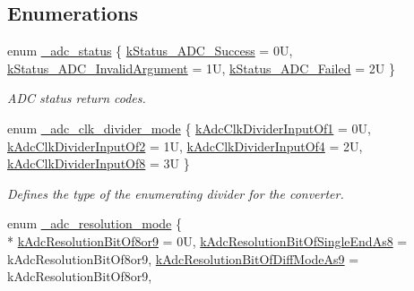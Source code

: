 \subsection*{Enumerations}
\begin{DoxyCompactItemize}
\item 
enum \hyperlink{group__adc__hal_ga058351bf32e58c665f0c7869f5cae4eb}{\+\_\+adc\+\_\+status} \{ \hyperlink{group__adc__hal_gga058351bf32e58c665f0c7869f5cae4eba71dfa17f1dfa9065f046127d9c4b49e3}{k\+Status\+\_\+\+A\+D\+C\+\_\+\+Success} = 0U, 
\hyperlink{group__adc__hal_gga058351bf32e58c665f0c7869f5cae4eba2fee5b051bf1951f27b2e162e4041a17}{k\+Status\+\_\+\+A\+D\+C\+\_\+\+Invalid\+Argument} = 1U, 
\hyperlink{group__adc__hal_gga058351bf32e58c665f0c7869f5cae4ebafedeadb3925bed1bf50a883b6c900521}{k\+Status\+\_\+\+A\+D\+C\+\_\+\+Failed} = 2U
 \}\begin{DoxyCompactList}\small\item\em A\+DC status return codes. \end{DoxyCompactList}
\item 
enum \hyperlink{group__adc__hal_gab7c3af47d538315640945a1a90460a08}{\+\_\+adc\+\_\+clk\+\_\+divider\+\_\+mode} \{ \hyperlink{group__adc__hal_ggab7c3af47d538315640945a1a90460a08a5c8ddf62a08acebd0fc23547e422bc5a}{k\+Adc\+Clk\+Divider\+Input\+Of1} = 0U, 
\hyperlink{group__adc__hal_ggab7c3af47d538315640945a1a90460a08aa8acb30681136a660a31453087d109db}{k\+Adc\+Clk\+Divider\+Input\+Of2} = 1U, 
\hyperlink{group__adc__hal_ggab7c3af47d538315640945a1a90460a08a0b4421a73a24bb0a00f67d70f87dadfb}{k\+Adc\+Clk\+Divider\+Input\+Of4} = 2U, 
\hyperlink{group__adc__hal_ggab7c3af47d538315640945a1a90460a08ae9da6126c381cd4c0b79d0f082a066d1}{k\+Adc\+Clk\+Divider\+Input\+Of8} = 3U
 \}\begin{DoxyCompactList}\small\item\em Defines the type of the enumerating divider for the converter. \end{DoxyCompactList}
\item 
enum \hyperlink{group__adc__hal_gaee9345624eca4f249688e14aa9369108}{\+\_\+adc\+\_\+resolution\+\_\+mode} \{ \\*
\hyperlink{group__adc__hal_ggaee9345624eca4f249688e14aa9369108a36289ac1aa77ad8e7dde4d5e838d863a}{k\+Adc\+Resolution\+Bit\+Of8or9} = 0U, 
\hyperlink{group__adc__hal_ggaee9345624eca4f249688e14aa9369108a8b339616a71c95d6878d2297beed3b51}{k\+Adc\+Resolution\+Bit\+Of\+Single\+End\+As8} = k\+Adc\+Resolution\+Bit\+Of8or9, 
\hyperlink{group__adc__hal_ggaee9345624eca4f249688e14aa9369108ac93b44b602c36b79617c425cbb236b66}{k\+Adc\+Resolution\+Bit\+Of\+Diff\+Mode\+As9} = k\+Adc\+Resolution\+Bit\+Of8or9, 

\end{DoxyCompactItemize}
